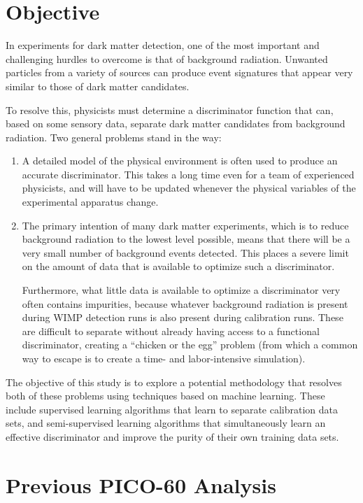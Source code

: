 \documentclass[10pt]{article}
\begin{document}
\section{Objective}

In experiments for dark matter detection, one of the most important and challenging hurdles to overcome is that of background radiation. Unwanted particles from a variety of sources can produce event signatures that appear very similar to those of dark matter candidates.

To resolve this, physicists must determine a discriminator function that can, based on some sensory data, separate dark matter candidates from background radiation. Two general problems stand in the way:

\begin{enumerate}
    \item A detailed model of the physical environment is often used to produce an accurate discriminator. This takes a long time even for a team of experienced physicists, and will have to be updated whenever the physical variables of the experimental apparatus change.

    \item The primary intention of many dark matter experiments, which is to reduce background radiation to the lowest level possible, means that there will be a very small number of background events detected. This places a severe limit on the amount of data that is available to optimize such a discriminator.

    Furthermore, what little data is available to optimize a discriminator very often contains impurities, because whatever background radiation is present during WIMP detection runs is also present during calibration runs. These are difficult to separate without already having access to a functional discriminator, creating a ``chicken or the egg'' problem (from which a common way to escape is to create a time- and labor-intensive simulation).
\end{enumerate}

The objective of this study is to explore a potential methodology that resolves both of these problems using techniques based on machine learning. These include supervised learning algorithms that learn to separate calibration data sets, and semi-supervised learning algorithms that simultaneously learn an effective discriminator and improve the purity of their own training data sets.

\section{Previous PICO-60 Analysis}
\end{document}
